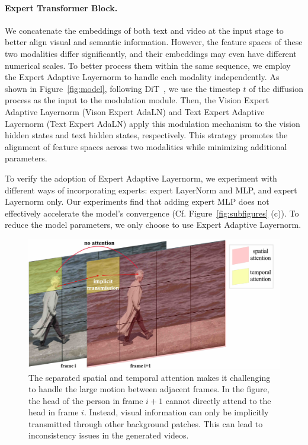 \paragraph{Expert Transformer Block.}
We concatenate the embeddings of both text and video at the input stage to better align visual and semantic information. 
However, the feature spaces of these two modalities differ significantly, and their embeddings may even have different numerical scales. 
To better process them within the same sequence, we employ the Expert Adaptive Layernorm to handle each modality independently.
As shown in Figure~\ref{fig:model}, following DiT~\citep{peebles2023scalable}, we use the timestep $t$ of the diffusion process as the input to the modulation module. 
Then, the Vision Expert Adaptive Layernorm (Vison Expert AdaLN) and Text Expert Adaptive Layernorm (Text Expert AdaLN) apply this modulation mechanism to the vision hidden states and text hidden states, respectively. 
This strategy promotes the alignment of feature spaces across two modalities while minimizing additional parameters.

To verify the adoption of Expert Adaptive Layernorm, we experiment with different ways of incorporating experts: expert LayerNorm and MLP, and expert Layernorm only. 
Our experiments find that adding expert MLP does not effectively accelerate the model's convergence (Cf. Figure~\ref{fig:subfigures} (c)). 
To reduce the model parameters, we only choose to use Expert Adaptive Layernorm.

\begin{figure}[h]
\centering
\includegraphics[width=0.7\linewidth]{images/attention.jpg}
\caption{The separated spatial and temporal attention makes it challenging to  handle the large motion between adjacent frames. 
In the figure, the head of the person in frame $i+1$ cannot directly attend to the head in frame $i$. 
Instead, visual information can only be implicitly transmitted through other background patches. 
This can lead to inconsistency issues in the generated videos.}
\label{fig:attention}
\end{figure}

